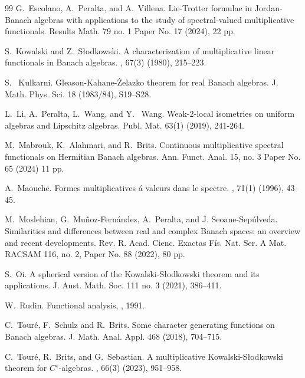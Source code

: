 \documentclass{amsart}
\theoremstyle{definition}
\theoremstyle{remark}
\begin{document}
  	
  	\begin{thebibliography}{99}
  		G.~Escolano, A.~Peralta, and A.~Villena.
  		\newblock Lie-Trotter formulae in Jordan-Banach algebras with applications to the study of spectral-valued multiplicative functionals.
  		\newblock Results Math. 79 no. 1 Paper No. 17 (2024), 22 pp.
  		
  		S.~Kowalski and Z.~S\l odkowski.
  		\newblock A characterization of multiplicative linear functionals in {B}anach
  		algebras.
  		, 67(3) (1980), 215--223. 
  		
  		S.~	Kulkarni.
  		\newblock Gleason-Kahane-Żelazko theorem for real Banach algebras.
  	    \newblock J. Math. Phys. Sci. 18 (1983/84), S19–S28.
  		
  		L.~Li, A.~Peralta, L.~Wang, and Y.~ Wang.
  		\newblock Weak-2-local isometries on uniform algebras and Lipschitz algebras.
  		\newblock Publ. Mat. 63(1) (2019), 241-264.
  		
  		
  		M.~Mabrouk, K.~Alahmari, and R.~Brits. 
  		\newblock Continuous multiplicative spectral functionals on Hermitian Banach algebras.
  		\newblock Ann. Funct. Anal. 15, no. 3 Paper No. 65 (2024) 11 pp.
  		
  		A.~Maouche.
  		\newblock Formes multiplicatives \'a valeurs dans le spectre.
  		, 71(1) (1996), 43--45.
  		
  		M.~Moslehian, G.~Muñoz-Fernández, A.~Peralta, and J. Seoane-Sepúlveda.
  		\newblock Similarities and differences between real and complex Banach spaces: an overview and recent developments.
  		\newblock Rev. R. Acad. Cienc. Exactas Fís. Nat. Ser. A Mat. RACSAM 116, no. 2, Paper No. 88 (2022), 80 pp.
  		
  		S.~Oi.
  		\newblock  A spherical version of the Kowalski-S\l odkowski theorem and its applications.
  		\newblock J. Aust. Math. Soc. 111 no. 3 (2021), 386–411.
  		
  		W.~Rudin.
  		\newblock Functional analysis,
  		, 1991.
  		
  			C.~Tour\'e, F.~Schulz and R.~Brits. 
  		\newblock Some character generating functions on Banach algebras.  	
  		\newblock J. Math. Anal. Appl. 468 (2018), 704–715.
  		
  		
  		C.~Tour\'e, R.~Brits, and G.~Sebastian.
  		\newblock A multiplicative {K}owalski-{S}\l odkowski theorem for  $C^\star$-algebras.
  		, 66(3) (2023), 951--958.
  		
  	\end{thebibliography}	
  	
\end{document}
